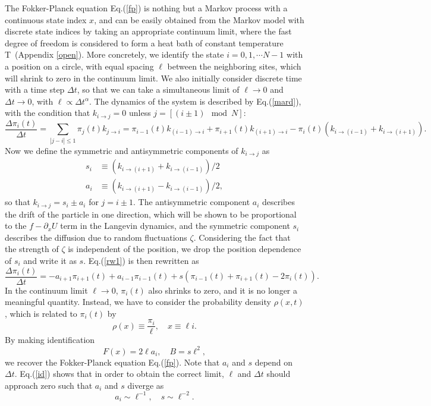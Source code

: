 \documentclass[aps,pre,amsmath,amssymb,floatfix,preprint,nofootinbib]{revtex4}
\begin{document}
The Fokker-Planck equation  Eq.(\ref{fp}) is nothing but a Markov process with a continuous state index $x$, and can be easily obtained from the Markov model with discrete state indices by taking an  appropriate continuum limit, where the fast degree of freedom is considered to form a heat bath of constant temperature T~(Appendix \ref{open}).  More concretely, we identify the state $i=0,1, \cdots N-1$ with a position on a circle, with equal spacing $\ell$  between the neighboring sites, which will shrink to zero in the continuum limit. We also initially consider discrete time with a time step $\Delta t$, so that we can take a simultaneous limit of $\ell \to 0$ and $\Delta t \to 0$, with $\ell \propto \Delta t^\alpha$. The dynamics of the system is described by Eq.(\ref{mard}), with the condition that $k_{i \to j}=0$ unless $j=\left[(i\pm 1) \mod N\right]$:
\begin{equation}
\frac{\Delta \pi_i(t)}{\Delta t} = \sum_{|j-i| \leq 1} \pi_j(t ) k_{j \to i} = \pi_{i-1}(t ) k_{(i-1) \to i} +\pi_{i+1}(t ) k_{(i+1) \to i} -  \pi_{i}(t)(k_{i \to (i-1)} + k_{i \to (i+1)} ). \label{rw1}  
\end{equation}
Now we define the symmetric and antisymmetric components of $k_{i \to j}$ as
\begin{eqnarray}
s_i &\equiv (k_{i \to (i+1)} + k_{i \to (i-1)})/2 \nonumber\\
a_i &\equiv (k_{i \to (i+1)} - k_{i \to (i-1)})/2,
\end{eqnarray}
so that $k_{i \to j} = s_i \pm a_i$ for $j= i \pm 1$. 
The antisymmetric component $a_i$ describes the drift of the particle in one direction, which will be shown to be proportional to the $f-\partial_x U$ term in the Langevin dynamics,  and the symmetric component $s_i$ describes the diffusion due to random fluctuations $\zeta$. Considering the fact that the strength of $\zeta$ is independent of the position, we drop the position dependence of $s_i$ and write it as $s$.  Eq.(\ref{rw1}) is then rewritten as
\begin{equation}
 \frac{\Delta \pi_i(t)}{\Delta t} = -a_{i+1} \pi_{i+1}(t) + a_{i-1} \pi_{i-1}(t) + s \left( \pi_{i-1}(t ) +\pi_{i+1}(t ) -  2 \pi_{i}(t)\right). \label{rw2} 
\end{equation}
In the continuum limit $\ell \to 0$, $\pi_i (t)$ also shrinks to zero,  and it is no longer a meaningful quantity. Instead, we have to consider the probability density $\rho(x,t)$, which is related to $\pi_i(t)$ by
\begin{equation}
\rho(x) \equiv \frac{\pi_i}{\ell}, \quad x \equiv \ell i.
\end{equation}
By making identification 
\begin{equation}
F(x)= 2 \ell a_i,\quad B = s \ell^2, \label{id} 
\end{equation}
we recover the Fokker-Planck equation Eq.(\ref{fp}).
Note that $a_i$ and $s$ depend on $\Delta t$. Eq.(\ref{id}) shows that in order to obtain the correct limit, $\ell$ and $\Delta t$ should approach zero such that $a_i$ and $s$ diverge as 
\begin{equation}
a_i \sim \ell^{-1},\quad s \sim \ell^{-2}. \label{scaling}
\end{equation}
\end{document}
